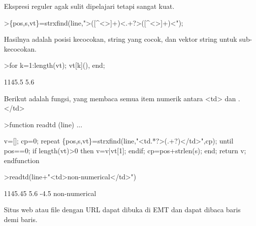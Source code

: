 \documentclass[a4paper,10pt]{article}
\begin{document}
\begin{eulernotebook}
\begin{eulercomment}
\begin{eulercomment}
\begin{eulercomment}
\begin{eulercomment}
\begin{eulercomment}
\begin{eulercomment}
\begin{eulercomment}
Ekspresi reguler agak sulit dipelajari tetapi sangat kuat.
\end{eulercomment}
\begin{eulerprompt}
>\{pos,s,vt\}=strxfind(line,">([^<>]+)<.+?>([^<>]+)<");
\end{eulerprompt}
\begin{eulercomment}
Hasilnya adalah posisi kecocokan, string yang cocok, dan vektor string
untuk sub-kecocokan.
\end{eulercomment}
\begin{eulerprompt}
>for k=1:length(vt); vt[k](), end;
\end{eulerprompt}
\begin{euleroutput}
  1145.5
  5.6
\end{euleroutput}
\begin{eulercomment}
Berikut adalah fungsi, yang membaca semua item numerik antara \textless{}td\textgreater{} dan
. \textless{}/td\textgreater{}
\end{eulercomment}
\begin{eulerprompt}
>function readtd (line) ...
\end{eulerprompt}
\begin{eulerudf}
  v=[]; cp=0;
  repeat
     \{pos,s,vt\}=strxfind(line,"<td.*?>(.+?)</td>",cp);
     until pos==0;
     if length(vt)>0 then v=v|vt[1]; endif;
     cp=pos+strlen(s);
  end;
  return v;
  endfunction
\end{eulerudf}
\begin{eulerprompt}
>readtd(line+"<td>non-numerical</td>")
\end{eulerprompt}
\begin{euleroutput}
  1145.45
  5.6
  -4.5
  non-numerical
\end{euleroutput}
\begin{eulercomment}
Situs web atau file dengan URL dapat dibuka di EMT dan dapat dibaca
baris demi baris.


\end{eulercomment}
\end{eulercomment}
\end{eulercomment}
\end{eulercomment}
\end{eulercomment}
\end{eulercomment}
\end{eulercomment}
\end{eulernotebook}
\end{document}
